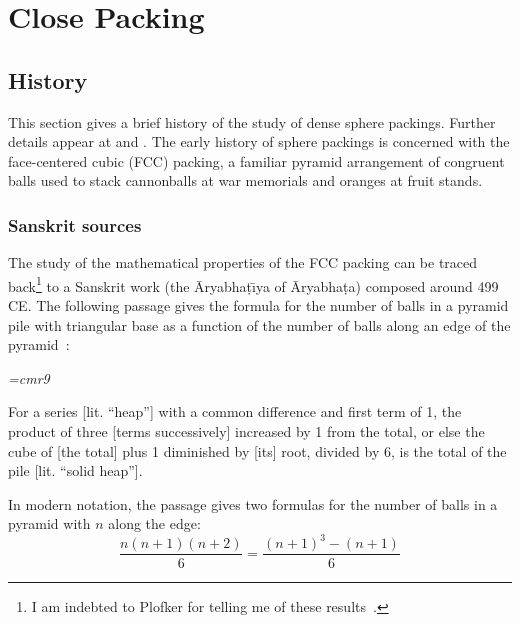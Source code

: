 

\chapter{Close Packing}

\section{History}\label{sec:history}

This section gives a brief history of the study of dense sphere
packings.  Further details appear at \cite{Szpiro} and
\cite{Hales:2006:overview}.
The early history of sphere packings is concerned with the
face-centered cubic (FCC) packing, a familiar pyramid arrangement
of congruent balls used to stack cannonballs at war memorials and
oranges at fruit stands.

\subsection{Sanskrit sources}



The study of the mathematical properties of the FCC
packing can be traced back\footnote{I am indebted to Plofker for
telling me of these results~\cite{Plo00}.} to a Sanskrit work (the \=Aryabha\d t\={\i}ya
 of \=Aryabha\d ta) composed around 499 CE.  The following passage gives
the formula for the number of balls in a pyramid pile with triangular base as
a function of the number of balls along an edge of the pyramid~\cite{Ary}:


\bigskip

{\narrower\it\font\ninerm=cmr9

For a series [lit. ``heap''] with a common difference and
  first term of 1, the product of three [terms successively] increased
  by 1 from the total, or else the cube of [the total] plus 1
  diminished by [its] root, divided by 6, is the total of the pile
  [lit. ``solid heap''].  

}

\bigskip

 In modern notation, the passage gives two formulas for the number of
 balls in a pyramid with $n$ along the edge:
\[
\dfrac{n(n+1)(n+2)}{6} =  \dfrac{(n+1)^3 - (n+1)}{6}
\]

